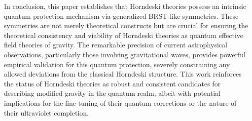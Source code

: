 \documentclass[twocolumn]{aastex631}
\begin{document}
In conclusion, this paper establishes that Horndeski theories possess an intrinsic quantum protection mechanism via generalized BRST-like symmetries. These symmetries are not merely theoretical constructs but are crucial for ensuring the theoretical consistency and viability of Horndeski theories as quantum effective field theories of gravity. The remarkable precision of current astrophysical observations, particularly those involving gravitational waves, provides powerful empirical validation for this quantum protection, severely constraining any allowed deviations from the classical Horndeski structure. This work reinforces the status of Horndeski theories as robust and consistent candidates for describing modified gravity in the quantum realm, albeit with potential implications for the fine-tuning of their quantum corrections or the nature of their ultraviolet completion.

{}

\end{document}
